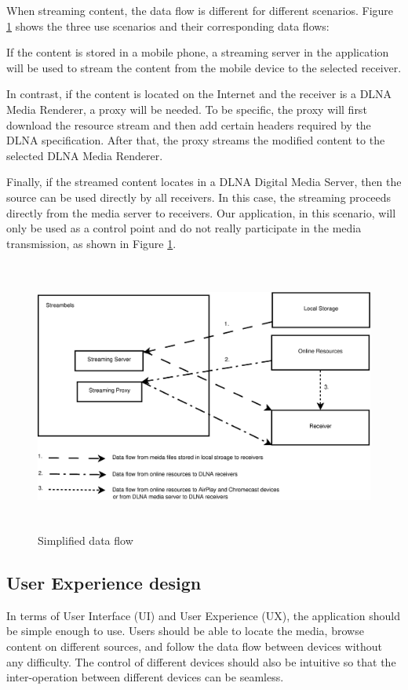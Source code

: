When streaming content, the data flow is different for different scenarios.
Figure \ref{chart4} shows the three use scenarios and their corresponding data
flows:

If the content is stored in a mobile phone, a streaming server in the
application will be used to stream the content from the mobile device to the
selected receiver.

In contrast, if the content is located on the Internet and the receiver is a
DLNA Media Renderer, a proxy will be needed. To be specific, the proxy will
first download the resource stream and then add certain headers required by the
DLNA specification. After that, the proxy streams the modified content to the
selected DLNA Media Renderer.

Finally, if the streamed content locates in a DLNA Digital Media Server, then
the source can be used directly by all receivers. In this case, the streaming
proceeds directly from the media server to receivers. Our application, in this
scenario, will only be used as a control point and do not really participate in
the media transmission, as shown in Figure \ref{chart4}.

\begin{figure}[htb]
\centering \includegraphics[height=9cm]{charts/data_flow}
\caption{Simplified data flow \label{chart4}}
\end{figure}

\subsection{User Experience design\label{3_3}}
In terms of User Interface (UI) and User Experience (UX), the application should
be simple enough to use. Users should be able to locate the media, browse
content on different sources, and follow the data flow between devices without
any difficulty. The control of different devices should also be intuitive so
that the inter-operation between different devices can be seamless.

